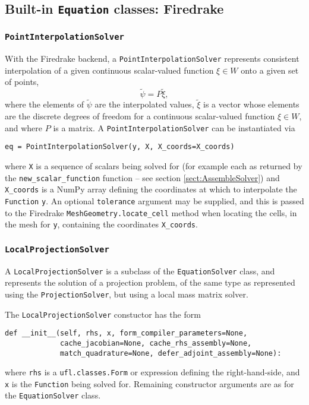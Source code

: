 \documentclass[11pt]{article}
\begin{document}
\subsection{Built-in \texttt{Equation} classes: Firedrake}

\subsubsection{\texttt{PointInterpolationSolver}}

With the Firedrake backend, a \texttt{PointInterpolationSolver} represents
consistent interpolation of a given continuous scalar-valued function
$\xi \in W$ onto a given set of points,
\begin{equation*}
  \tilde{\psi} = P \tilde{\xi},
\end{equation*}
where the elements of $\tilde{\psi}$ are the interpolated values, $\tilde{\xi}$
is a vector whose elements are the discrete degrees of freedom for a continuous
scalar-valued function $\xi \in W$, and where $P$ is a matrix. A
\texttt{PointInterpolationSolver} can be instantiated via
\begin{lstlisting}
eq = PointInterpolationSolver(y, X, X_coords=X_coords)
\end{lstlisting}
where \texttt{X} is a sequence of scalars being solved for (for example each as
returned by the \texttt{new\_scalar\_function} function -- see section
\ref{sect:AssembleSolver}) and \texttt{X\_coords} is a NumPy array defining the
coordinates at which to interpolate the \texttt{Function} \texttt{y}. An
optional \texttt{tolerance} argument may be supplied, and this is passed to the
Firedrake \texttt{MeshGeometry.locate\_cell} method when locating the cells, in
the mesh for \texttt{y}, containing the coordinates \texttt{X\_coords}.

\subsubsection{\texttt{LocalProjectionSolver}}

A \texttt{LocalProjectionSolver} is a subclass of the \texttt{EquationSolver}
class, and represents the solution of a projection problem, of the same type as
represented using the \texttt{ProjectionSolver}, but using a local mass matrix
solver.

The \texttt{LocalProjectionSolver} constuctor has the form
\begin{lstlisting}
def __init__(self, rhs, x, form_compiler_parameters=None,
             cache_jacobian=None, cache_rhs_assembly=None,
             match_quadrature=None, defer_adjoint_assembly=None):
\end{lstlisting}
where \texttt{rhs} is a \texttt{ufl.classes.Form} or expression defining
the right-hand-side, and \texttt{x} is the \texttt{Function} being solved for.
Remaining constructor arguments are as for the \texttt{EquationSolver} class.
\end{document}
